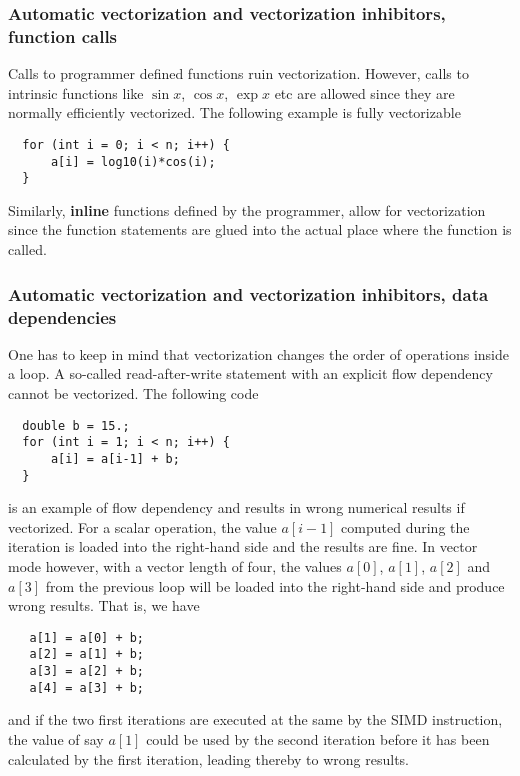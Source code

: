 \documentclass{beamer}
\begin{document}
\begin{frame}
\frametitle{Automatic vectorization and vectorization inhibitors, function calls}

Calls to programmer defined functions ruin vectorization. However, calls to intrinsic functions like
$\sin{x}$, $\cos{x}$, $\exp{x}$ etc are allowed since they are normally efficiently vectorized. 
The following example is fully vectorizable
\begin{verbatim}
  for (int i = 0; i < n; i++) {
      a[i] = log10(i)*cos(i);
  }
\end{verbatim}
Similarly, \textbf{inline} functions defined by the programmer, allow for vectorization since the function statements are glued into the actual place where the function is called.
\end{frame}

\begin{frame}
\frametitle{Automatic vectorization and vectorization inhibitors, data dependencies}

One has to keep in mind that vectorization changes the order of operations inside a loop. A so-called
read-after-write statement with an explicit flow dependency cannot be vectorized. The following code
\begin{verbatim}
  double b = 15.;
  for (int i = 1; i < n; i++) {
      a[i] = a[i-1] + b;
  }
\end{verbatim}
is an example of flow dependency and results in wrong numerical results if vectorized. For a scalar operation, the value $a[i-1]$ computed during the iteration is loaded into the right-hand side and the results are fine. In vector mode however, with a vector length of four, the values $a[0]$, $a[1]$, $a[2]$ and $a[3]$ from the previous loop will be loaded into the right-hand side and produce wrong results. That is, we have
\begin{verbatim}
   a[1] = a[0] + b;
   a[2] = a[1] + b;
   a[3] = a[2] + b;
   a[4] = a[3] + b;
\end{verbatim}
and if the two first iterations are  executed at the same by the SIMD instruction, the value of say $a[1]$ could be used by the second iteration before it has been calculated by the first iteration, leading thereby to wrong results.
\end{frame}
\end{document}
